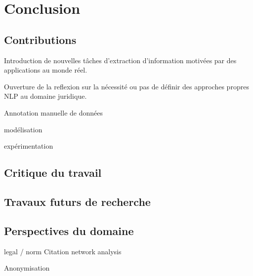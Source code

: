 \chapter*{Conclusion}
\label{sec:conclusion}

\section{Contributions}
\label{sec:conclusion:contributions}
Introduction de nouvelles tâches d'extraction d'information motivées par des applications au monde réel.

Ouverture de la reflexion sur la nécessité ou pas de définir des approches propres NLP au domaine juridique.

Annotation manuelle de données

modélisation

expérimentation


\section{Critique du travail}
\label{sec:conclusion:critique}

\section{Travaux futurs de recherche}
\label{sec:conclusion:extensions}

\section{Perspectives du domaine}
\label{sec:conclusion:perspectives}
legal / norm Citation network analysis

Anonymisation